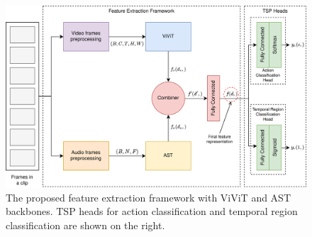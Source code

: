 \begin{figure}
\centering
\includegraphics[width=\linewidth]{assets/img/tsp/tsp-arch.png}
\caption{The proposed feature extraction framework with ViViT and AST backbones. TSP heads for action classification and temporal region classification are shown on the right.}
\label{fig:tsp-arch}
\end{figure}

